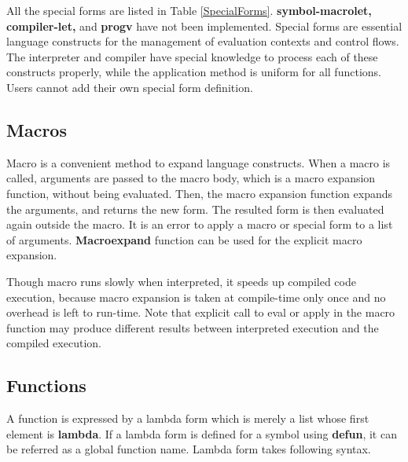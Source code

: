 All the special forms are listed in Table \ref{SpecialForms}.
{\bf symbol-macrolet, compiler-let,} and {\bf progv} have not been implemented.
Special forms are essential language constructs for the management of
evaluation contexts and control flows.
The interpreter and compiler have special knowledge to
process each of these constructs properly, while the application
method is uniform for all functions.
Users cannot add their own special form definition.

\subsection{Macros}

Macro is a convenient method to expand language constructs.
When a macro is called, arguments are passed to the macro body,
which is a macro expansion function, without being evaluated.
Then, the macro expansion function expands the arguments,
and returns the new form.
The resulted form is then evaluated again outside the macro.
It is an error to apply a macro or special form to a list of arguments.
{\bf Macroexpand} function can be used for the explicit macro expansion.

Though macro runs slowly when interpreted,
it speeds up compiled code execution,
because macro expansion is taken at compile-time only once
and no overhead is left to run-time.
Note that explicit call to eval or apply in the macro function may
produce different results between interpreted execution
and the compiled execution.

\subsection{Functions}

A function is expressed by a lambda form which is merely a list
whose first element is {\bf lambda}.
If a lambda form is defined for a symbol using {\bf defun}, it can be referred
as a global function name.
Lambda form takes following syntax.


